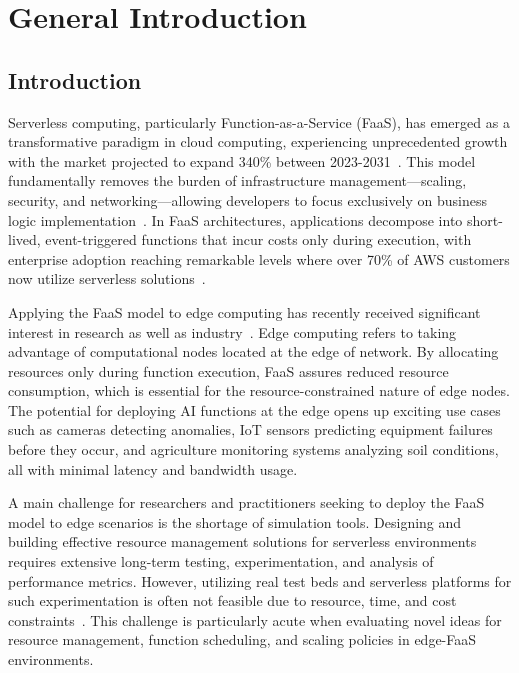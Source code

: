 \chapter{General Introduction}

\section{Introduction}

Serverless computing, particularly Function-as-a-Service (FaaS), has emerged as a transformative paradigm in cloud computing, experiencing unprecedented growth with the market projected to expand 340\% between 2023-2031~\cite{datam2024serverless}. This model fundamentally removes the burden of infrastructure management—scaling, security, and networking—allowing developers to focus exclusively on business logic implementation~\cite{baldini2017serverless}. In FaaS architectures, applications decompose into short-lived, event-triggered functions that incur costs only during execution, with enterprise adoption reaching remarkable levels where over 70\% of AWS customers now utilize serverless solutions~\cite{datadog2023serverless}.

Applying the FaaS model to edge computing has recently received significant interest in research as well as industry~\cite{aslanpour2021serverless}. Edge computing refers to taking advantage of computational nodes located at the edge of network. By allocating resources only during function execution, FaaS assures reduced resource consumption, which is essential for the resource-constrained nature of edge nodes. The potential for deploying AI functions at the edge opens up exciting use cases such as cameras detecting anomalies, IoT sensors predicting equipment failures before they occur, and agriculture monitoring systems analyzing soil conditions, all with minimal latency and bandwidth usage.

A main challenge for researchers and practitioners seeking to deploy the FaaS model to edge scenarios is the shortage of simulation tools. Designing and building effective resource management solutions for serverless environments requires extensive long-term testing, experimentation, and analysis of performance metrics. However, utilizing real test beds and serverless platforms for such experimentation is often not feasible due to resource, time, and cost constraints~\cite{mampage2021cloudsimsc}. This challenge is particularly acute when evaluating novel ideas for resource management, function scheduling, and scaling policies in edge-FaaS environments.

